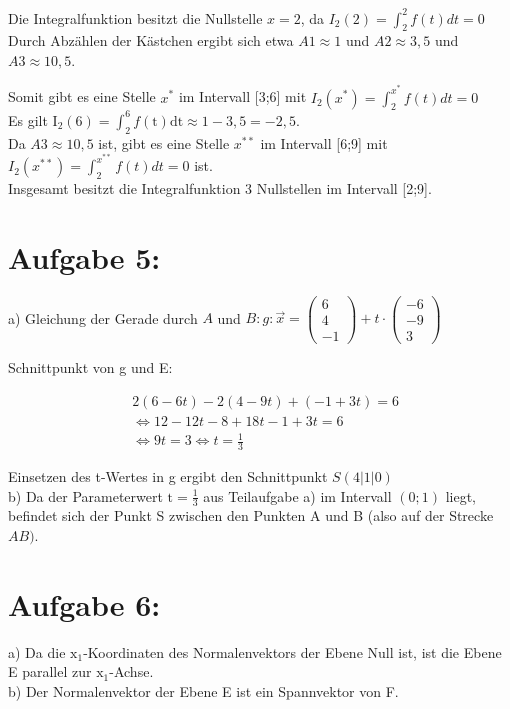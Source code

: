 \documentclass[10pt]{article}
\begin{document}
Die Integralfunktion besitzt die Nullstelle $x=2$, da $I_{2}(2)=\int_{2}^{2} f(t) d t=0$\\
Durch Abzählen der Kästchen ergibt sich etwa $A 1 \approx 1$ und $A 2 \approx 3,5$ und $A 3 \approx 10,5$.

Somit gibt es eine Stelle $x^{*}$ im Intervall [3;6] mit $I_{2}\left(x^{*}\right)=\int_{2}^{x^{*}} f(t) d t=0$\\
Es gilt $\mathrm{I}_{2}(6)=\int_{2}^{6} f(\mathrm{t}) \mathrm{dt} \approx 1-3,5=-2,5$.\\
Da $A 3 \approx 10,5$ ist, gibt es eine Stelle $x^{* *}$ im Intervall [6;9] mit $I_{2}\left(x^{* *}\right)=\int_{2}^{x^{* *}} f(t) d t=0$ ist.\\[0pt]
Insgesamt besitzt die Integralfunktion 3 Nullstellen im Intervall [2;9].

\section*{Aufgabe 5:}
a) Gleichung der Gerade durch $A$ und $B: g: \vec{x}=\left(\begin{array}{c}6 \\ 4 \\ -1\end{array}\right)+t \cdot\left(\begin{array}{c}-6 \\ -9 \\ 3\end{array}\right)$

Schnittpunkt von g und E:

$$
\begin{aligned}
& 2(6-6 t)-2(4-9 t)+(-1+3 t)=6 \\
& \Leftrightarrow 12-12 t-8+18 t-1+3 t=6 \\
& \Leftrightarrow 9 t=3 \Leftrightarrow t=\frac{1}{3}
\end{aligned}
$$

Einsetzen des t-Wertes in g ergibt den Schnittpunkt $S(4|1| 0)$\\
b) Da der Parameterwert $\mathrm{t}=\frac{1}{3}$ aus Teilaufgabe a) im Intervall $(0 ; 1)$ liegt, befindet sich der Punkt S zwischen den Punkten A und B (also auf der Strecke $A B)$.

\section*{Aufgabe 6:}
a) Da die $\mathrm{x}_{1}$-Koordinaten des Normalenvektors der Ebene Null ist, ist die Ebene E parallel zur $\mathrm{x}_{1}$-Achse.\\
b) Der Normalenvektor der Ebene E ist ein Spannvektor von F.
\end{document}
